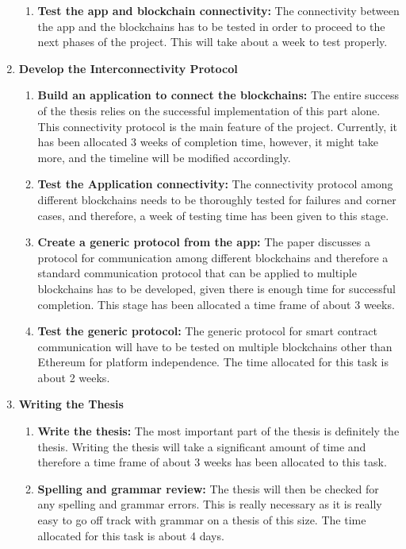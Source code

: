 \documentclass[a4paper,twoside,phd]{BYUPhys}
\begin{document}
\begin{enumerate}
\begin{enumerate}
        \item \textbf{Test the app and blockchain connectivity:} The connectivity between the app and the blockchains has to be tested in order to proceed to the next phases of the project. This will take about a week to test properly.
    \end{enumerate}
    \item \textbf{Develop the Interconnectivity Protocol}
    \begin{enumerate}
        \item \textbf{Build an application to connect the blockchains:} The entire success of the thesis relies on the successful implementation of this part alone. This connectivity protocol is the main feature of the project. Currently, it has been allocated 3 weeks of completion time, however, it might take more, and the timeline will be modified accordingly.
        \item \textbf{Test the Application connectivity:} The connectivity protocol among different blockchains needs to be thoroughly tested for failures and corner cases, and therefore, a week of testing time has been given to this stage.
        \item \textbf{Create a generic protocol from the app:} The paper discusses a protocol for communication among different blockchains and therefore a standard communication protocol that can be applied to multiple blockchains has to be developed, given there is enough time for successful completion. This stage has been allocated a time frame of about 3 weeks.
        \item \textbf{Test the generic protocol:} The generic protocol for smart contract communication will have to be tested on multiple blockchains other than Ethereum for platform independence. The time allocated for this task is about 2 weeks.
    \end{enumerate}
    \item \textbf{Writing the Thesis}
    \begin{enumerate}
        \item \textbf{Write the thesis:} The most important part of the thesis is definitely the thesis. Writing the thesis will take a significant amount of time and therefore a time frame of about 3 weeks has been allocated to this task.
        \item \textbf{Spelling and grammar review:} The thesis will then be checked for any spelling and grammar errors. This is really necessary as it is really easy to go off track with grammar on a thesis of this size. The time allocated for this task is about 4 days.

\end{enumerate}
\end{enumerate}
\end{document}
